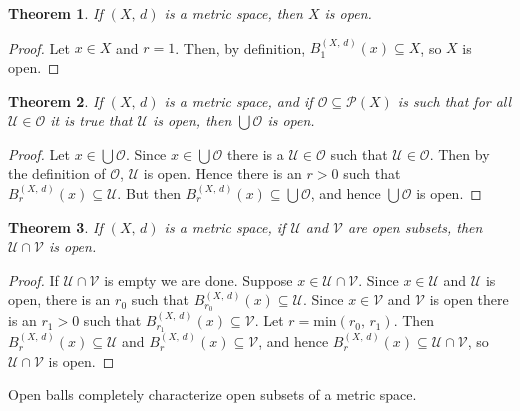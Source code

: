 \documentclass{article}
\theoremstyle{plain}
\newtheorem{theorem}{Theorem}[section]
\theoremstyle{normal}
\begin{document}
        \begin{theorem}
            If $(X,\,d)$ is a metric space, then
            $X$ is open.
        \end{theorem}
        \begin{proof}
            Let $x\in{X}$ and $r=1$. Then, by definition,
            $B_{1}^{(X,\,d)}(x)\subseteq{X}$, so $X$ is open.
        \end{proof}
        \begin{theorem}
            If $(X,\,d)$ is a metric space, and if
            $\mathcal{O}\subseteq\mathcal{P}(X)$ is such that for all
            $\mathcal{U}\in\mathcal{O}$ it is true that $\mathcal{U}$ is open,
            then $\bigcup\mathcal{O}$ is open.
        \end{theorem}
        \begin{proof}
            Let $x\in\bigcup\mathcal{O}$. Since $x\in\bigcup\mathcal{O}$
            there is a $\mathcal{U}\in\mathcal{O}$ such that
            $\mathcal{U}\in\mathcal{O}$. Then by the definition of
            $\mathcal{O}$, $\mathcal{U}$ is open. Hence there is an
            $r>0$ such that $B_{r}^{(X,\,d)}(x)\subseteq\mathcal{U}$.
            But then $B_{r}^{(X,\,d)}(x)\subseteq\bigcup\mathcal{O}$, and
            hence $\bigcup\mathcal{O}$ is open.
        \end{proof}
        \begin{theorem}
            If $(X,\,d)$ is a metric space, if $\mathcal{U}$ and
            $\mathcal{V}$ are open subsets, then
            $\mathcal{U}\cap\mathcal{V}$ is open.
        \end{theorem}
        \begin{proof}
            If $\mathcal{U}\cap\mathcal{V}$ is empty we are done.
            Suppose $x\in\mathcal{U}\cap\mathcal{V}$. Since
            $x\in\mathcal{U}$ and $\mathcal{U}$ is open, there is an
            $r_{0}$ such that
            $B_{r_{0}}^{(X,\,d)}(x)\subseteq\mathcal{U}$. Since
            $x\in\mathcal{V}$ and $\mathcal{V}$ is open there is an
            $r_{1}>0$ such that $B_{r_{1}}^{(X,\,d)}(x)\subseteq\mathcal{V}$.
            Let $r=\textrm{min}(r_{0},\,r_{1})$. Then
            $B_{r}^{(X,\,d)}(x)\subseteq\mathcal{U}$ and
            $B_{r}^{(X,\,d)}(x)\subseteq\mathcal{V}$, and hence
            $B_{r}^{(X,\,d)}(x)\subseteq\mathcal{U}\cap\mathcal{V}$, so
            $\mathcal{U}\cap\mathcal{V}$ is open.
        \end{proof}
        Open balls completely characterize open subsets of a metric space.
\end{document}
